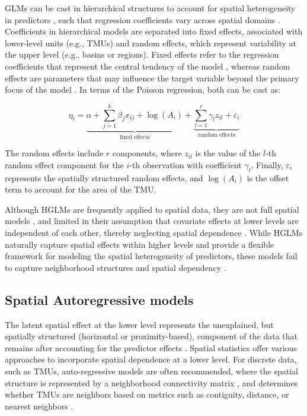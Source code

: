 \documentclass[journal abbreviation, manuscript]{copernicus}
\begin{document}
GLMs can be cast in hierarchical structures to account for spatial heterogeneity in predictors \citep{lee1996hierarchical, lee2017data}, such that regression coefficients vary across spatial domains \citep{atkinson1998generalized, ma2021bayesian, dalthorp2004generalized}. Coefficients in hierarchical models are separated into fixed effects, associated with lower-level units (e.g., TMUs) and random effects, which represent variability at the upper level (e.g., basins or regions). Fixed effects refer to the regression coefficients that represent the central tendency of the model \citep{torres2007panel}, whereas random effects are parameters that may influence the target variable beyond the primary focus of the model \citep{firebaugh2013fixed}. In terms of the Poisson regression, both can be cast as:

\begin{equation}
\eta_i = \underbrace{\alpha + \sum_{j=1}^k \beta_j x_{ij} + \log(A_i)}_{\text{fixed effects}} + \underbrace{\sum_{l=1}^r \gamma_l z_{il} + \varepsilon_i}_{\text{random effects}}
\end{equation}

The random effects include $r$ components, where $z_{il}$ is the value of the $l$-th random effect component for the $i$-th observation with coefficient $\gamma_{l}$. Finally, $\varepsilon_i$ represents the spatially structured random effects, and $\log(A_i)$ is the offset term to account for the area of the TMU.

Although HGLMs are frequently applied to spatial data, they are not full spatial models \citep{dong2015multilevel}, and limited in their assumption that covariate effects at lower levels are independent of each other, thereby neglecting spatial dependence \citep{raudenbush2002hierarchical, goldstein2011multilevel}. While HGLMs naturally capture spatial effects within higher levels and provide a flexible framework for modeling the spatial heterogeneity of predictors, these models fail to capture neighborhood structures and spatial dependency \citep{dong2015multilevel, osland2016accounting, rabe2008multilevel}.


\subsection{Spatial Autoregressive models}\label{subsec22}

The latent spatial effect at the lower level represents the unexplained, but spatially structured (horizontal or proximity-based), component of the data that remains after accounting for the predictor effects \citep{austin2013covariate, aigner1984latent}. Spatial statistics offer various approaches to incorporate spatial dependence at a lower level. For discrete data, such as TMUs, auto-regressive models are often recommended, where the spatial structure is represented by a neighborhood connectivity matrix \citep{rodrigues2012bayesian}, and determines whether TMUs are neighbors based on metrics such as contiguity, distance, or nearest neighbors \citep{moraga2023spatial}.
\end{document}
